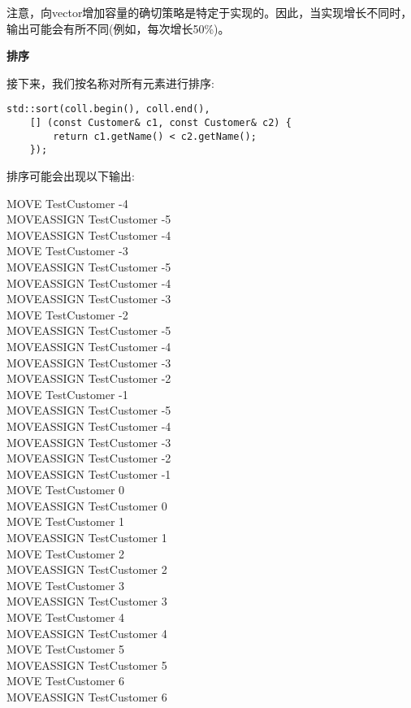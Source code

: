 注意，向vector增加容量的确切策略是特定于实现的。因此，当实现增长不同时，输出可能会有所不同(例如，每次增长50\%)。\par

\textbf{排序}

接下来，我们按名称对所有元素进行排序:\par

\begin{lstlisting}[caption={}]
std::sort(coll.begin(), coll.end(),
	[] (const Customer& c1, const Customer& c2) {
		return c1.getName() < c2.getName();
	});
\end{lstlisting}

排序可能会出现以下输出:\par

\begin{tcolorbox}[colback=white,colframe=black]
MOVE TestCustomer -4 \\
MOVEASSIGN TestCustomer -5 \\
MOVEASSIGN TestCustomer -4 \\
MOVE TestCustomer -3 \\
MOVEASSIGN TestCustomer -5 \\
MOVEASSIGN TestCustomer -4 \\
MOVEASSIGN TestCustomer -3 \\
MOVE TestCustomer -2 \\
MOVEASSIGN TestCustomer -5 \\
MOVEASSIGN TestCustomer -4 \\
MOVEASSIGN TestCustomer -3 \\
MOVEASSIGN TestCustomer -2 \\
MOVE TestCustomer -1 \\
MOVEASSIGN TestCustomer -5 \\
MOVEASSIGN TestCustomer -4 \\
MOVEASSIGN TestCustomer -3 \\
MOVEASSIGN TestCustomer -2 \\
MOVEASSIGN TestCustomer -1 \\
MOVE TestCustomer 0 \\
MOVEASSIGN TestCustomer 0 \\
MOVE TestCustomer 1 \\
MOVEASSIGN TestCustomer 1 \\
MOVE TestCustomer 2 \\
MOVEASSIGN TestCustomer 2 \\
MOVE TestCustomer 3 \\
MOVEASSIGN TestCustomer 3 \\
MOVE TestCustomer 4 \\
MOVEASSIGN TestCustomer 4 \\
MOVE TestCustomer 5 \\
MOVEASSIGN TestCustomer 5 \\ 
MOVE TestCustomer 6 \\
MOVEASSIGN TestCustomer 6 \\
\end{tcolorbox}

